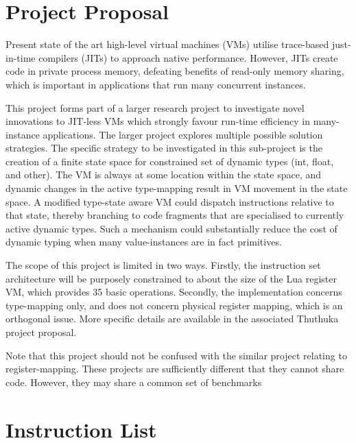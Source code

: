 \documentclass[english,a4paper,12pt]{report}
\begin{document}
 


\newpage{}
\appendix
\chapter{Project Proposal} 

Present state of the art high-level virtual machines (VMs) utilise
trace-based just-in-time compilers (JITs) to approach native
performance. However, JITs create code in private process memory,
defeating benefits of read-only memory sharing, which is important in
applications that run many concurrent instances. 

This project forms part of a larger research project to investigate
novel innovations to JIT-less VMs which strongly favour run-time
efficiency in many-instance applications. The larger project explores
multiple possible solution strategies. The specific strategy to be
investigated in this sub-project is the creation of a finite state
space for constrained set of dynamic types (int, float, and
other). The VM is always at some location within the state space, and
dynamic changes in the active type-mapping result in VM movement in
the state space. A modified type-state aware VM could dispatch
instructions relative to that state, thereby branching to code
fragments that are specialised to currently active dynamic types. Such
a mechanism could substantially reduce the cost of dynamic typing when
many value-instances are in fact primitives. 

The scope of this project is limited in two ways. Firstly, the
instruction set architecture will be purposely constrained to about
the size of the Lua register VM, which provides 35 basic
operations. Secondly, the implementation concerns type-mapping only,
and does not concern physical register mapping, which is an orthogonal
issue. More specific details are available in the associated Thuthuka
project proposal.

Note that this project should not be confused with the similar project
relating to register-mapping. These projects are sufficiently
different that they cannot share code. However, they may share a
common set of benchmarks

\chapter{Instruction List} 
\label{appendix-b}
\end{document}

